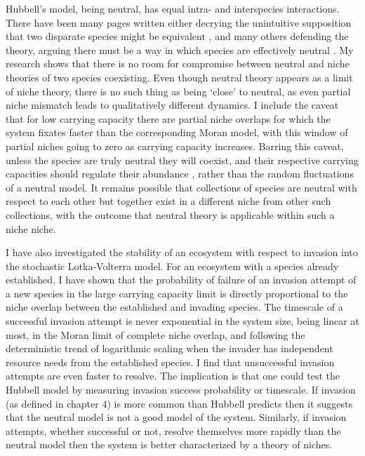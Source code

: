 Hubbell's model, being neutral, has equal intra- and interspecies interactions. 
There have been many pages written either decrying the unintuitive supposition that two disparate species might be equivalent \cite{Ricklefs2006,Kalyuzhny2014,Carroll2015}, and many others defending the theory, arguing there must be a way in which species are effectively neutral \cite{Hubbell2006,Rosindell2011}. %
My research shows that there is no room for compromise between neutral and niche theories of two species coexisting. 
Even though neutral theory appears as a limit of niche theory, there is no such thing as being `close' to neutral, as even partial niche mismatch leads to qualitatively different dynamics. 
I include the caveat that for low carrying capacity there are partial niche overlaps for which the system fixates faster than the corresponding Moran model, with this window of partial niches going to zero as carrying capacity increases. %
Barring this caveat, unless the species are truly neutral they will coexist, and their respective carrying capacities should regulate their abundance \cite{MacArthur1957,Sugihara2003,Leibold1995}, rather than the random fluctuations of a neutral model. 
It remains possible that collections of species are neutral with respect to each other but together exist in a different niche from other such collections, with the outcome that neutral theory is applicable within such a niche niche. 

I have also investigated the stability of an ecosystem with respect to invasion into the stochastic Lotka-Volterra model. 
For an ecosystem with a species already established, I have shown that the probability of failure of an invasion attempt of a new species in the large carrying capacity limit is directly proportional to the niche overlap between the established and invading species. 
The timescale of a successful invasion attempt is never exponential in the system size, being linear at most, in the Moran limit of complete niche overlap, and following the deterministic trend of logarithmic scaling when the invader has independent resource needs from the established species. 
I find that unsuccessful invasion attempts are even faster to resolve. 
The implication is that one could test the Hubbell model by measuring invasion success probability or timescale. 
If invasion (as defined in chapter 4) is more common than Hubbell predicts then it suggests that the neutral model is not a good model of the system. 
Similarly, if invasion attempts, whether successful or not, resolve themselves more rapidly than the neutral model then the system is better characterized by a theory of niches. 

